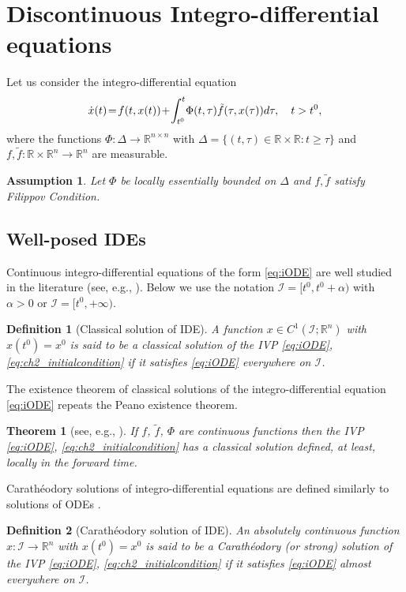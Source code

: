 \documentclass{article}
\newcommand{\R}{\mathbb{R}}
\newtheorem{theorem}{Theorem}
\newtheorem{definition}{Definition}
\newtheorem{assumption}{Assumption}
\begin{document}
\section{Discontinuous Integro-differential equations}\label{sec:IDE}
Let us consider  the integro-differential equation\vspace{-1mm}
\begin{equation}\label{eq:iODE}
	\dot x(t)\!=\!f(t,x(t))\!+\!\int^t_{t^0} \!\Phi(t,\tau) \tilde f(\tau,x(\tau)) d\tau, \quad t>t^0,\vspace{-1mm}
\end{equation}
where the functions $\Phi:\Delta\to  \R^{n\times n}$ with  $\Delta=\{(t,\tau)\in \R\times \R: t\geq \tau\}$
and $f,\tilde f:\R\times \R^n\to\R^n$ are measurable.  
\begin{assumption}\label{as:ex_IDE}\itshape
		Let $\Phi$ be locally essentially bounded on $\Delta$ and $f,\tilde f$ satisfy Filippov Condition. 
\end{assumption}
\vspace{-2mm}
\subsection{Well-posed  IDEs}
Continuous integro-differential equations of the form \eqref{eq:iODE} are well studied in the literature (see, e.g.,  \cite{Lakshmikantham_etal1995:Book}). Below  we use the notation $\mathcal{I}=[t^0,t^0+\alpha)$ with $\alpha>0$ or $\mathcal{I}=[t^0,+\infty)$.
\begin{definition}[\small Classical solution of IDE]\itshape
	A  function $ x\in C^1(\mathcal{I};  \R^n)$ with $x(t^0)=x^0$ is said to be a classical solution of the IVP   \eqref{eq:iODE},  \eqref{eq:ch2_initialcondition} if
	it satisfies  \eqref{eq:iODE} everywhere on  $\mathcal{I}$.
\end{definition}
The existence theorem of classical solutions of the integro-differential equation \eqref{eq:iODE} repeats the Peano existence theorem.
\begin{theorem}[see, e.g., \cite{Lakshmikantham_etal1995:Book}]\label{thm:peano_iODE}\itshape
If $f$, $\tilde f$, $\Phi$ are continuous  functions  then  the IVP \eqref{eq:iODE}, \eqref{eq:ch2_initialcondition} has a classical solution defined, at least, locally in the forward time.
	\end{theorem}
Carath\'{e}odory solutions of integro-differential equations are defined similarly to solutions of ODEs  \cite{OReganMeehan1998:Book}.
\begin{definition}[\small Carath\'{e}odory solution of IDE]\itshape
	An absolutely  continuous function $ x:\mathcal{I}\to \R^n$ with  $x(t^0)=x^0$ is said to be a Carath\'{e}odory (or strong) solution of the IVP   \eqref{eq:iODE},  \eqref{eq:ch2_initialcondition} if
	it satisfies  \eqref{eq:iODE} almost everywhere on  $\mathcal{I}$.
\end{definition}
\end{document}
